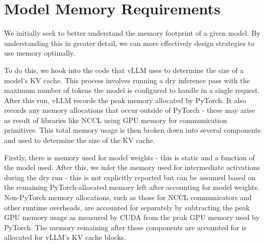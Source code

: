 \documentclass[11pt,twoside]{report}
\begin{document}
\section{Model Memory Requirements}

We initially seek to better understand the memory footprint of a given model.
By understanding this in greater detail, we can more effectively design strategies to use memory optimally.

To do this, we hook into the code that vLLM uses to determine the size of a model's KV cache.
This process involves running a dry inference pass with the maximum number of tokens the model is configured to handle in a single request.
After this run, vLLM records the peak memory allocated by PyTorch.
It also records any memory allocations that occur outside of PyTorch - these may arise as result of libraries like NCCL using GPU memory for communication primitives.
This total memory usage is then broken down into several components and used to determine the size of the KV cache.

Firstly, there is memory used for model weights - this is static and a function of the model used.
After this, we infer the memory used for intermediate activations during the dry run - this is not explicitly reported but can be assumed based on the remaining PyTorch-allocated memory left after accounting for model weights.
Non-PyTorch memory allocations, such as those for NCCL communicators and other runtime overheads, are accounted for separately by subtracting the peak GPU memory usage as measured by CUDA from the peak GPU memory used by PyTorch.
The memory remaining after these components are accounted for is allocated for vLLM's KV cache blocks.
\end{document}

